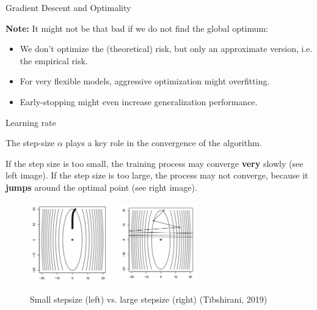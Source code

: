 \begin{vbframe}{Gradient Descent and Optimality}
\begin{minipage}{0.5\textwidth}
\begin{figure}
    \end{figure}
  \end{minipage}  

  \framebreak 

  \textbf{Note: } It might not be that bad if we do not find the global optimum:  

  \begin{itemize}
    \item We don't optimize the (theoretical) risk, but only an approximate version, i.e. the empirical risk. 
    \item For very flexible models, aggressive optimization might overfitting. 
    \item Early-stopping might even increase generalization performance. 
  \end{itemize}

\end{vbframe}


\begin{vbframe}{Learning rate}

The step-size $\alpha$ plays a key role in the convergence of the algorithm.
\lz

If the step size is too small, the training process may converge \textbf{very} slowly (see left image). If the step size is too large, the process may not converge, because it \textbf{jumps} around the optimal point (see right image).

\begin{figure}
\begin{center}
\includegraphics[width = 0.3\textwidth]{figure/stepsize_small.png}~~
\includegraphics[width = 0.3\textwidth]{figure/stepsize_large.png}
\caption{Small stepsize (left) vs. large stepsize (right) (Tibshirani, 2019)}
\end{center}
\end{figure}
\end{vbframe}

